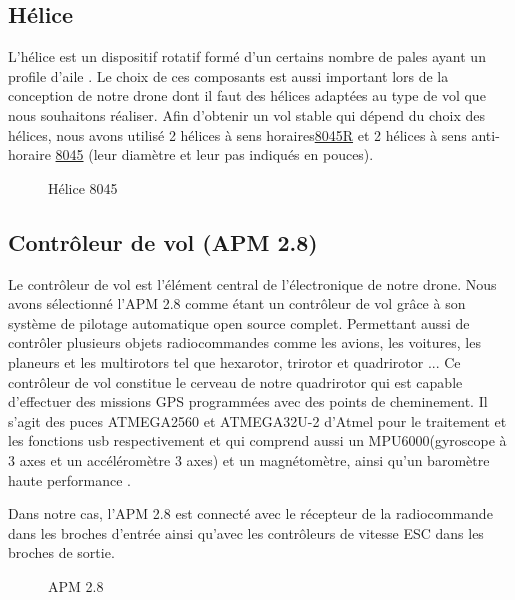 	\subsection{Hélice}
	L'hélice est un dispositif rotatif formé d’un certains nombre de pales ayant un profile d'aile \cite{aerohesbaye}. Le choix de ces composants est aussi important lors de la conception de notre drone dont il faut des hélices adaptées au type de vol que nous souhaitons réaliser. Afin d'obtenir un vol stable qui dépend du choix des hélices, nous avons utilisé 2 hélices à sens horaires\underline{8045R} et 2 hélices à sens anti-horaire \underline{8045} (leur diamètre et leur pas indiqués en pouces)\cite{FPV24}.
	\begin{figure} [H]
		\begin{center}
			\centering
		\end{center}
		\caption{Hélice 8045}
	\end{figure}
	\subsection {Contrôleur de vol (APM 2.8)}
	Le contrôleur de vol est l'élément central de l'électronique de notre drone.
	Nous avons sélectionné l'APM 2.8 comme étant un contrôleur de vol grâce à son système de pilotage automatique open source complet. Permettant aussi de contrôler plusieurs objets radiocommandes comme les avions, les voitures, les planeurs et les multirotors tel que hexarotor, trirotor et quadrirotor ...
	Ce contrôleur de vol constitue le cerveau de notre quadrirotor qui est capable d'effectuer des missions GPS programmées avec des points de cheminement. Il s'agit des puces ATMEGA2560 et ATMEGA32U-2 d'Atmel pour le traitement et les fonctions usb respectivement et qui comprend aussi un MPU6000(gyroscope à 3 axes et un accéléromètre 3 axes)  et un magnétomètre, ainsi qu'un baromètre haute performance \cite{abraelectronics}.
	
	Dans notre cas, l'APM 2.8 est connecté avec le récepteur de la radiocommande dans les broches d’entrée ainsi qu'avec les contrôleurs de vitesse ESC dans les broches de sortie. 
	
	\begin{figure} [H]
		\begin{center}
			\centering
		\end{center}
		\caption{APM 2.8}
	\end{figure}
	
